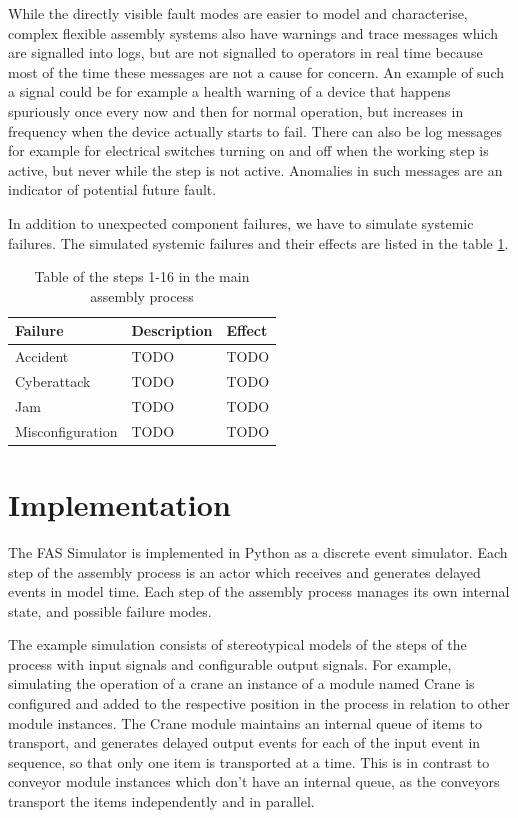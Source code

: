 \documentclass[journal]{IEEEtran}
\begin{document}
While the directly visible fault modes are easier to model and characterise, complex flexible assembly systems also have warnings and trace messages
which are signalled into logs, but are not signalled to operators in real time because most of the time these messages are not a cause for concern.
An example of such a signal could be for example a health warning of a device that happens spuriously once every now and then for normal operation,
but increases in frequency when the device actually starts to fail. There can also be log messages for example for electrical switches turning
on and off when the working step is active, but never while the step is not active. Anomalies in such messages are an indicator of potential
future fault.

In addition to unexpected component failures, we have to simulate systemic failures. The simulated systemic failures and their effects are listed in the table \ref{systemicfailures}.

\begin{table}[!t]
\renewcommand{\arraystretch}{1.3}
\caption{Table of the steps 1-16 in the main assembly process}
\label{systemicfailures}
\centering
\begin{tabular}{|p{20mm}|p{20mm}|p{20mm}|}
\hline
Failure & Description & Effect \\
\hline
\hline
Accident & TODO  & TODO \\
\hline
Cyberattack & TODO  & TODO \\
\hline
Jam & TODO  & TODO \\
\hline
Misconfiguration & TODO  & TODO \\
\hline
\end{tabular}
\end{table}

\section{Implementation}

The FAS Simulator\cite{FASSimulator} is implemented in Python as a discrete event simulator. Each step of the assembly process is an actor which receives and generates
delayed events in model time. Each step of the assembly process manages its own internal state, and possible failure modes.

The example simulation consists of stereotypical models of the steps of the process with input signals and configurable output signals. For example, simulating
the operation of a crane an instance of a module named Crane is configured and added to the respective position in the process in relation to other module instances.
The Crane module maintains an internal queue of items to transport, and generates delayed output events for each of the input event in sequence, so that only one item is
transported at a time. This is in contrast to conveyor module instances which don't have an internal queue, as the conveyors transport the items independently and in parallel.
\end{document}
